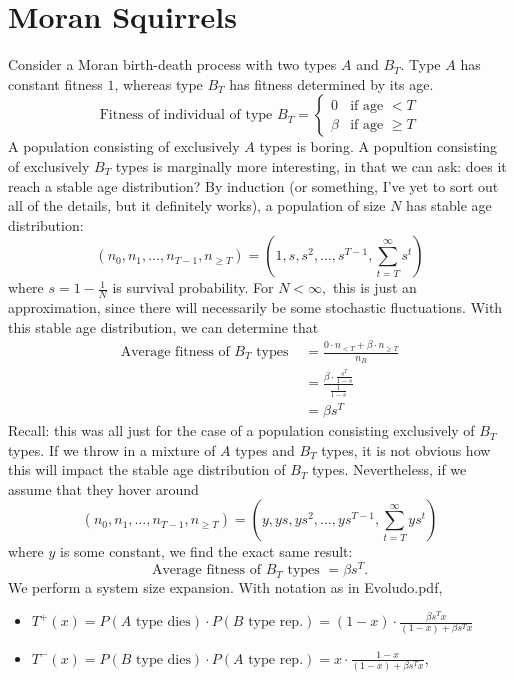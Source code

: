 \section{Moran Squirrels}
Consider a Moran birth-death process with two types $A$ and $B_T$. Type $A$ has constant fitness $1$, whereas type $B_T$ has
fitness determined by its age.
$$ \text{Fitness of individual of type }B_T =
\begin{cases}
    0 & \text{if age }<T \\
    \beta & \text{if age }\ge T
\end{cases}
$$
A population consisting of exclusively $A$ types is boring. A popultion consisting of exclusively $B_T$ types is marginally more interesting,
in that we can ask: does it reach a stable age distribution? By induction (or something, I've yet to sort out all of the details, but
it definitely works), a population of size $N$ has stable age distribution:
$$\left( n_0, n_1, \ldots, n_{T-1}, n_{\ge T} \right) = \left( 1, s, s^2, \ldots, s^{T-1}, \sum\limits_{t = T}^\infty s^t \right)$$
where $s = 1 - \frac{1}{N}$ is survival probability. For $N < \infty,$ this is just an approximation, since there will necessarily be some
stochastic fluctuations. With this stable age distribution, we can determine that
\begin{align*}
    \text{Average fitness of }B_T\text{ types } &= \frac{0\cdot n_{<T} + \beta\cdot n_{\ge T}}{n_B} \\
    &= \frac{\beta \cdot \frac{s^T}{1-s}}{\frac{1}{1-s}} \\
    &= \beta s^T
\end{align*}
Recall: this was all just for the case of a population consisting exclusively of $B_T$ types. If we throw in a mixture of $A$ types
and $B_T$ types, it is not obvious how this will impact the stable age distribution of $B_T$ types. Nevertheless, if we assume that
they hover around
$$\left( n_0, n_1, \ldots, n_{T-1}, n_{\ge T} \right) = \left( y, ys, ys^2, \ldots, ys^{T-1}, \sum\limits_{t = T}^\infty ys^t \right)$$
where $y$ is some constant, we find the exact same result:
$$\text{Average fitness of }B_T\text{ types } = \beta s^{T}.$$
We perform a system size expansion. With notation as in Evoludo.pdf, 
\begin{itemize}
    \item $T^+(x) = P\left( A \text{ type dies} \right)\cdot P( B \text{ type rep.}) = (1-x)\cdot \frac{\beta s^T x}{(1-x) + \beta s^T x}$
    \item $T^-(x) = P\left( B \text{ type dies} \right)\cdot P( A \text{ type rep.}) = 
        x\cdot \frac{1 - x}{(1 - x) + \beta s^T x}$,
\end{itemize}
